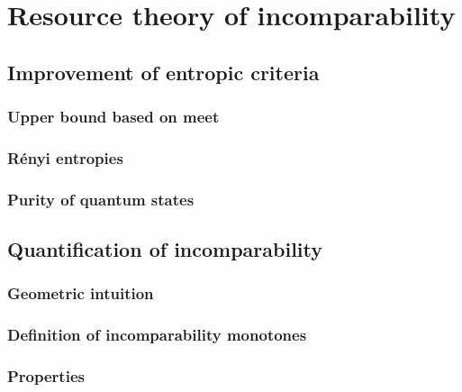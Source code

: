 \chapter{Resource theory of incomparability}

\section{Improvement of entropic criteria}

\subsection{Upper bound based on meet}

\subsection{Rényi entropies}

\subsection{Purity of quantum states}

\section{Quantification of incomparability}

\subsection{Geometric intuition}

\subsection{Definition of incomparability monotones}

\subsection{Properties}

